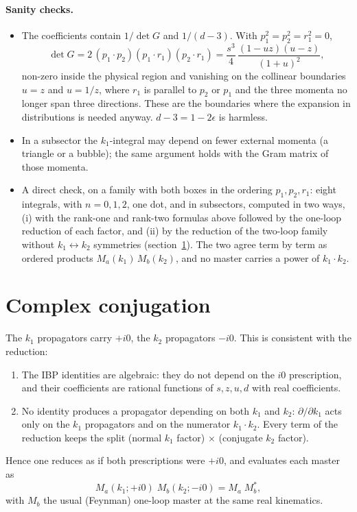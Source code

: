 \documentclass[11pt,a4paper]{article}
\newcommand{\ep}{\epsilon}
\begin{document}
\paragraph{Sanity checks.}
\begin{itemize}
\item The coefficients contain $1/\det G$ and $1/(d-3)$. With $p_1^2=p_2^2=r_1^2=0$,
\begin{equation}
\det G=2\,(p_1\cdot p_2)(p_1\cdot r_1)(p_2\cdot r_1)=\frac{s^3}{4}\,\frac{(1-uz)(u-z)}{(1+u)^2},
\end{equation}
non-zero inside the physical region and vanishing on the collinear boundaries $u=z$ and $u=1/z$, where $r_1$ is
parallel to $p_2$ or $p_1$ and the three momenta no longer span three directions. These are the boundaries where the
expansion in distributions is needed anyway. $d-3=1-2\ep$ is harmless.
\item In a subsector the $k_1$-integral may depend on fewer external momenta (a triangle or a bubble); the same
argument holds with the Gram matrix of those momenta.
\item A direct check, on a family with both boxes in the ordering $p_1,p_2,r_1$: eight integrals, with $n=0,1,2$,
one dot, and in subsectors, computed in two ways, (i) with the rank-one and rank-two formulas above followed by the
one-loop reduction of each factor, and (ii) by the reduction of the two-loop family without $k_1\leftrightarrow k_2$
symmetries (section~\ref{sec:conj}). The two agree term by term as ordered products $M_a(k_1)\,M_b(k_2)$, and no master
carries a power of $k_1\cdot k_2$.
\end{itemize}

\section{Complex conjugation}\label{sec:conj}

The $k_1$ propagators carry $+i0$, the $k_2$ propagators $-i0$. This is consistent with the reduction:
\begin{enumerate}
\item The IBP identities are algebraic: they do not depend on the $i0$ prescription, and their coefficients are
rational functions of $s,z,u,d$ with real coefficients.
\item No identity produces a propagator depending on both $k_1$ and $k_2$: $\partial/\partial k_1$ acts only on the
$k_1$ propagators and on the numerator $k_1\cdot k_2$. Every term of the reduction keeps the split (normal $k_1$
factor) $\times$ (conjugate $k_2$ factor).
\end{enumerate}
Hence one reduces as if both prescriptions were $+i0$, and evaluates each master as
\begin{equation}
M_a(k_1;+i0)\;M_b(k_2;-i0)=M_a\;M_b^{*},
\end{equation}
with $M_b$ the usual (Feynman) one-loop master at the same real kinematics.
\end{document}
